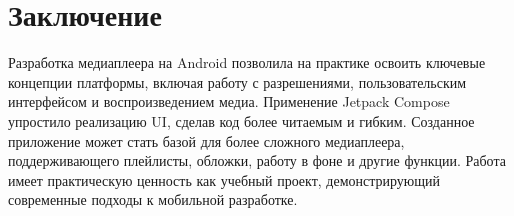 \chapter{Заключение}
Разработка медиаплеера на Android позволила на практике освоить ключевые концепции платформы, включая работу с разрешениями, пользовательским интерфейсом и воспроизведением медиа.
Применение Jetpack Compose упростило реализацию UI, сделав код более читаемым и гибким.
Созданное приложение может стать базой для более сложного медиаплеера, поддерживающего плейлисты, обложки, работу в фоне и другие функции.
Работа имеет практическую ценность как учебный проект, демонстрирующий современные подходы к мобильной разработке.

\newpage